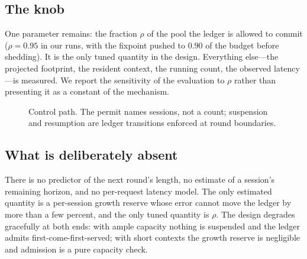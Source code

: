 \subsection{The knob}

One parameter remains: the fraction $\rho$ of the pool the ledger is allowed to commit
($\rho=0.95$ in our runs, with the fixpoint pushed to $0.90$ of the budget before shedding).
It is the only tuned quantity in the design. Everything else---the projected footprint,
the resident context, the running count, the observed latency---is measured. We report the
sensitivity of the evaluation to $\rho$ rather than presenting it as a constant of the
mechanism.

\begin{figure}[t]
\centering
{}
\caption{Control path. The permit names sessions, not a count; suspension and resumption
are ledger transitions enforced at round boundaries.}
\label{fig:overview}
\end{figure}

\subsection{What is deliberately absent}

There is no predictor of the next round's length, no estimate of a session's remaining
horizon, and no per-request latency model. The only estimated quantity is a per-session
growth reserve whose error cannot move the ledger by more than a few percent, and the only
tuned quantity is $\rho$. The design degrades gracefully at both ends: with ample capacity
nothing is suspended and the ledger admits first-come-first-served; with short contexts
the growth reserve is negligible and admission is a pure capacity check.

